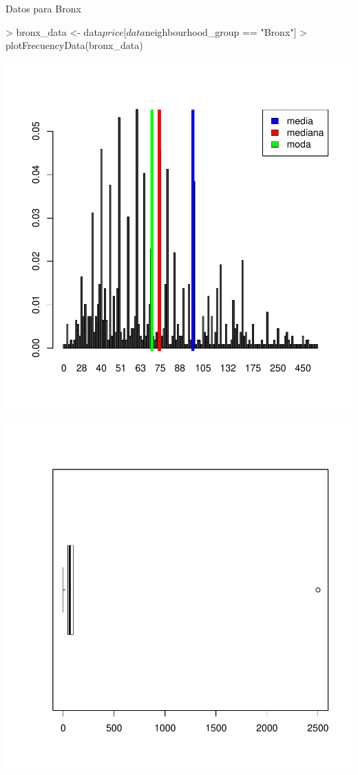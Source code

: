 \documentclass [a4paper] {article}
\begin{document}
Datos para Bronx
\begin{center}
\begin{Schunk}
\begin{Sinput}
> bronx_data <- data$price[data$neighbourhood_group == "Bronx"]
> plotFrecuencyData(bronx_data)
\end{Sinput}
\end{Schunk}
\includegraphics{entrega-026}
\end{center}
\begin{center}
\includegraphics{entrega-027}
\end{center}
\end{document}
